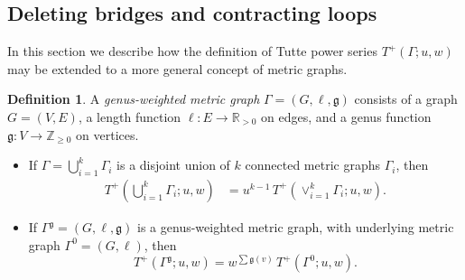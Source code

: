 \documentclass{amsart}
\theoremstyle{definition}
\newtheorem{dfn}[thm]{Definition}
\newcommand{\RR}{\mathbb{R}}
\newcommand{\ZZ}{\mathbb{Z}}
\newcommand{\fg}{\mathfrak{g}}
\newcommand{\RRpos}{\RR_{>0}}
\newcommand{\fanalog}[2]{[\![#2]\!]_{#1}}
\begin{document}

\subsection{Deleting bridges and contracting loops}
In this section we describe how the definition of Tutte power series $T^+(\Gamma;u,w)$
may be extended to a more general concept of metric graphs.

\begin{dfn}
A {\em genus-weighted metric graph}
$\Gamma = (G,\ell, \fg)$
consists of a graph $G = (V,E)$,
a length function $\ell : E \to \RRpos$ on edges,
and a genus function
$\fg: V \to \ZZ_{\geq 0}$ on vertices.
\end{dfn}

\begin{itemize}
\item
If $\Gamma = \bigcup_{i=1}^k \Gamma_i$ is a disjoint union of $k$ connected metric graphs $\Gamma_i$,
then 
\begin{align*}
T^+\left(\bigcup_{i=1}^k \Gamma_i ; u,w \right) 
&= u^{k-1}\, T^+\left(\vee_{i=1}^k \Gamma_i; u,w \right) .
\end{align*}

\item
If $\Gamma^{\fg} = (G,\ell,\fg)$ is a genus-weighted metric graph,
with underlying metric graph $\Gamma^0 = (G,\ell)$,
then
\[
	T^+(\Gamma^{\fg}; u,w) = w^{\sum \fg(v)} \, T^+(\Gamma^0; u,w).
\]
\end{itemize}
\end{document}

